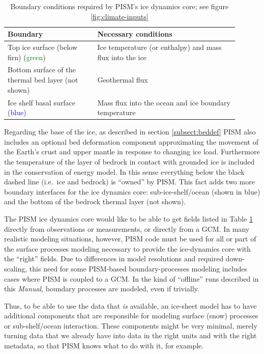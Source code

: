 \begin{table}[h]
  \centering
 \begin{tabular}{p{0.35\linewidth}p{0.55\linewidth}}
    \toprule
    \textbf{Boundary} & \textbf{Necessary conditions}\\
    \midrule
    Top ice surface (below firn) (\textcolor{green}{green})& Ice temperature (or enthalpy) and mass flux into the ice\\
    Bottom surface of the thermal bed layer (not shown) & Geothermal flux\\
    Ice shelf basal surface (\textcolor{blue}{blue})& Mass flux into the ocean and ice boundary temperature\\
   \bottomrule
  \end{tabular}
\caption{Boundary conditions required by PISM's ice dynamics core; see figure \ref{fig:climate-inputs}}
\label{tab:ice-dynamics-bc}
\end{table}

Regarding the base of the ice, as described in section \ref{subsect:beddef} PISM also includes an optional bed deformation component approximating the movement of the Earth's crust and upper mantle in response to changing ice load.   Furthermore the temperature of the layer of bedrock in contact with grounded ice is included in the conservation of energy model.  In this sense everything below the black dashed line (i.e.~ice and bedrock) is ``owned'' by PISM.  This fact adds two more boundary interfaces for the ice dynamics core: sub-ice-shelf/ocean (shown in blue) and the bottom of the bedrock thermal layer (not shown).

The PISM ice dynamics core would like to be able to get fields listed in Table
\ref{tab:ice-dynamics-bc} directly from observations or measurements, or directly from a GCM.  In many realistic modeling situations, however, PISM code must be used for all or part of the surface processes modeling necessary to provide the ice-dynamics core with the ``right'' fields.  Due to differences in model resolutions and required down-scaling, this need for some PISM-based boundary-processes modeling includes cases where PISM is coupled to a GCM.  In the kind of ``offline'' runs described in this \emph{Manual}, boundary processes are modeled, even if trivially.

Thus, to be able to use the data that \emph{is} available, an ice-sheet model has to
have additional components that are responsible for modeling surface (snow)
processes or sub-shelf/ocean interaction.  These components might be very minimal, merely turning data that we already have into data in the right units and with the right metadata, so that PISM knows what to do with it, for example.

